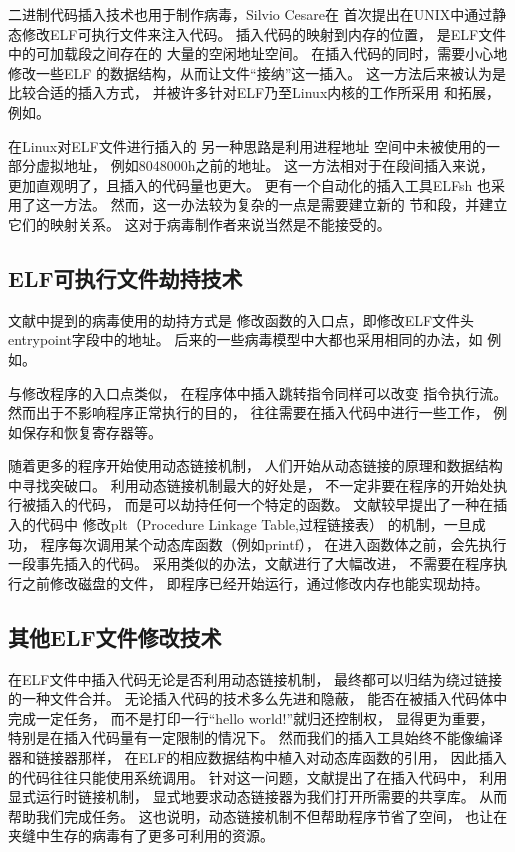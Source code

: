 二进制代码插入技术也用于制作病毒，Silvio Cesare在\cite{silvio}
首次提出在UNIX中通过静态修改ELF可执行文件来注入代码。
插入代码的映射到内存的位置，
是ELF文件中的可加载段之间存在的
大量的空闲地址空间。
在插入代码的同时，需要小心地修改一些ELF
的数据结构，从而让文件“接纳”这一插入。
这一方法后来被认为是比较合适的插入方式，
并被许多针对ELF乃至Linux内核的工作所采用
和拓展，
例如\cite{simple,prototype,subversive,cerberus,sharelib}。


在Linux对ELF文件进行插入的
另一种思路是利用进程地址
空间中未被使用的一部分虚拟地址，
例如8048000h之前的地址。
这一方法相对于在段间插入来说，
更加直观明了，且插入的代码量也更大。
更有一个自动化的插入工具ELFsh
也采用了这一方法。
然而，这一办法较为复杂的一点是需要建立新的
节和段，并建立它们的映射关系。
这对于病毒制作者来说当然是不能接受的。

\subsection{ELF可执行文件劫持技术}

文献\cite{silvio}中提到的病毒使用的劫持方式是
修改函数的入口点，即修改ELF文件头entrypoint字段中的地址。
后来的一些病毒模型中大都也采用相同的办法，如
例如\cite{simple,prototype}。

与修改程序的入口点类似，
在程序体中插入跳转指令同样可以改变
指令执行流。然而出于不影响程序正常执行的目的，
往往需要在插入代码中进行一些工作，
例如保存和恢复寄存器等。

随着更多的程序开始使用动态链接机制，
人们开始从动态链接的原理和数据结构中寻找突破口。
利用动态链接机制最大的好处是，
不一定非要在程序的开始处执行被插入的代码，
而是可以劫持任何一个特定的函数。
文献\cite{sharelib}较早提出了一种在插入的代码中
修改plt（Procedure Linkage Table,过程链接表）
的机制，一旦成功，
程序每次调用某个动态库函数（例如printf），
在进入函数体之前，会先执行一段事先插入的代码。
采用类似的办法，文献\cite{modern}进行了大幅改进，
不需要在程序执行之前修改磁盘的文件，
即程序已经开始运行，通过修改内存也能实现劫持。


\subsection{其他ELF文件修改技术}
在ELF文件中插入代码无论是否利用动态链接机制，
最终都可以归结为绕过链接的一种文件合并。
无论插入代码的技术多么先进和隐蔽，
能否在被插入代码体中完成一定任务，
而不是打印一行“hello world!”就归还控制权，
显得更为重要，
特别是在插入代码量有一定限制的情况下。
然而我们的插入工具始终不能像编译器和链接器那样，
在ELF的相应数据结构中植入对动态库函数的引用，
因此插入的代码往往只能使用系统调用。
针对这一问题，文献\cite{subversive}提出了在插入代码中，
利用显式运行时链接机制，
显式地要求动态链接器为我们打开所需要的共享库。
从而帮助我们完成任务。
这也说明，动态链接机制不但帮助程序节省了空间，
也让在夹缝中生存的病毒有了更多可利用的资源。


